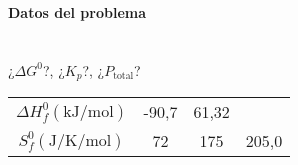 
\begin{frame}
	\frametitle{\ejerciciocmd}
	\framesubtitle{Datos del problema}
	\begin{center}
		 	\\[.6cm]
		{\huge ¿$\Delta G^0$?, ¿$K_p$?, ¿$P_{\text{total}}$?}\\[.6cm]
		{\large \begin{tabular}{cSSS}
			\toprule
			& {} & {} 	& {}	\\
			\midrule
			$\Delta H^0_f(\si{\kilo\joule\per\mol})$	& 	-90,7		&	61,32		&				\\
			$S^0_f(\si{\joule\per\kelvin\per\mol})$		&	 72			&  175			& 	205,0		\\
			\bottomrule
		\end{tabular}}
	\end{center}
\end{frame}

